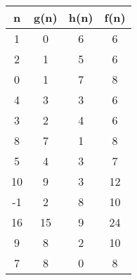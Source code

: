 \documentclass[11pt]{article}
\begin{document}
\begin{center}
  \begin{tabular}{| c | c | c | c |}
  \hline
  \textbf{n} & \textbf{g(n)} & \textbf{h(n)} & \textbf{f(n)} \\ \hline
  1 & 0 & 6 & 6 \\ \hline
  2 & 1 & 5 & 6 \\ \hline
  0 & 1 & 7 & 8 \\ \hline
  4 & 3 & 3 & 6 \\ \hline
  3 & 2 & 4 & 6 \\ \hline
  8 & 7 & 1 & 8 \\ \hline
  5 & 4 & 3 & 7 \\ \hline
  10 & 9 & 3 & 12 \\ \hline
  -1 & 2 & 8 & 10 \\ \hline
  16 & 15 & 9 & 24 \\ \hline
  9 & 8 & 2 & 10 \\ \hline
  7 & 8 & 0 & 8 \\ \hline
  \end{tabular}
  \end{center}
\end{document}
